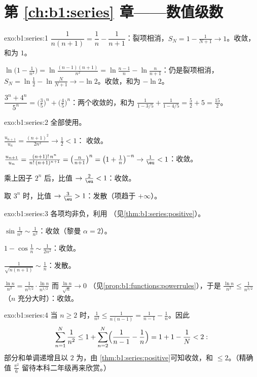 \section*{第 \ref{ch:b1:series} 章——数值级数}

\begin{solution}{exo:b1:series:1}
$\dfrac{1}{n(n+1)} = \dfrac1n - \dfrac{1}{n+1}$：裂项相消，$S_N =
1 - \frac{1}{N+1} \to 1$。收敛，和为 $1$。

$\ln\bigl(1 - \frac{1}{n^2}\bigr) = \ln\frac{(n-1)(n+1)}{n^2} =
\ln\frac{n-1}{n} - \ln\frac{n}{n+1}$：仍是裂项相消，$S_N =
\ln\frac12 - \ln\frac{N}{N+1} \to -\ln 2$。收敛，和为 $-\ln 2$。

$\dfrac{3^n + 4^n}{5^n} = \bigl(\frac35\bigr)^n +
\bigl(\frac45\bigr)^n$：两个收敛的，和为
$\frac{1}{1 - 3/5} + \frac{1}{1 - 4/5} = \frac52 + 5 = \frac{15}{2}$。
\end{solution}

\begin{solution}{exo:b1:series:2}
全部使用。

$\frac{u_{n+1}}{u_n} = \frac{(n+1)^2}{2n^2} \to \frac12 < 1$：
收敛。

$\frac{u_{n+1}}{u_n} = \frac{(n+1)!\,n^n}{n!\,(n+1)^{n+1}} =
\bigl(\frac{n}{n+1}\bigr)^n = \bigl(1 + \frac1n\bigr)^{-n} \to
\frac1\eu < 1$：收敛。

乘上因子 $2^n$ 后，比值 $\to \frac2\eu < 1$：收敛。

取 $3^n$ 时，比值 $\to \frac3\eu > 1$：发散（项趋于
$+\infty$）。
\end{solution}

\begin{solution}{exo:b1:series:3}
各项均非负，利用
（见\cref{thm:b1:series:positive}）。

$\sin\frac{1}{n^2} \sim \frac{1}{n^2}$：收敛（黎曼 $\alpha
= 2$）。

$1 - \cos\frac1n \sim \frac{1}{2n^2}$：收敛。

$\frac{1}{\sqrt{n(n+1)}} \sim \frac1n$：发散。

$\frac{\ln n}{n^2} = \frac{1}{n^{3/2}}\cdot\frac{\ln n}{n^{1/2}}$
而 $\frac{\ln n}{\sqrt n} \to 0$
（见\cref{prop:b1:functions:powerrules}），于是 $\frac{\ln n}{n^2} \leq
\frac{1}{n^{3/2}}$（$n$ 充分大时）：收敛。
\end{solution}

\begin{solution}{exo:b1:series:4}
当 $n \geq 2$ 时，$\frac{1}{n^2} \leq \frac{1}{n(n-1)} =
\frac{1}{n-1} - \frac1n$。因此
\[
\sum_{n=1}^{N} \frac{1}{n^2} \leq 1 + \sum_{n=2}^{N}
\Bigl(\frac{1}{n-1} - \frac1n\Bigr) = 1 + 1 - \frac1N < 2 :
\]
部分和单调递增且以 $2$ 为，由
\cref{thm:b1:series:positive}可知收敛，和 $\leq 2$。（精确值
$\frac{\pi^2}{6}$ 留待本科二年级再来欣赏。）
\end{solution}

